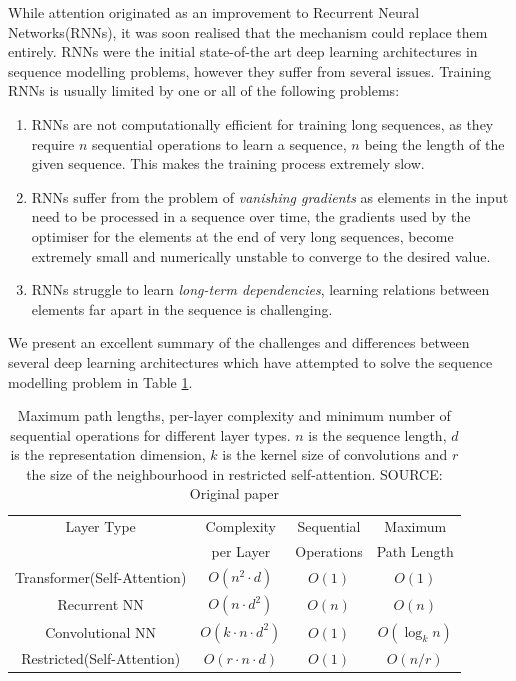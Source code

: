 While attention originated as an improvement to Recurrent Neural Networks(RNNs), it was soon realised that the mechanism could replace them entirely.\cite{vaswaniAttentionAllYou2017}
RNNs were the initial state-of-the art deep learning architectures in sequence modelling problems, however they suffer from several issues. Training RNNs is usually limited by one or all of the following problems:
\begin{enumerate}
\item RNNs are not computationally efficient for training long sequences, as they require $n$ sequential operations to learn a sequence, $n$ being the length of the given sequence. This makes the training process extremely slow.
\item RNNs suffer from the problem of \emph{vanishing gradients} \ie as elements in the input need to be processed in a sequence over time, the gradients used by the optimiser\cite{Robbins2007ASA} for the elements at the end of very long sequences, become extremely small and numerically unstable to converge to the desired value.
\item RNNs struggle to learn \emph{long-term dependencies}, \ie learning relations between elements far apart in the sequence is challenging.
\end{enumerate}

We present an excellent summary of the challenges and differences between several deep learning architectures which have attempted to solve the sequence modelling problem in Table \ref{bg:table1}.

\begin{table}[htbp]
\centering
\begin{tabular}{ c   c   c  c  }
\toprule
Layer Type & Complexity   & Sequential   & Maximum \\
& per Layer & Operations & Path Length \\
\midrule
Transformer(Self-Attention) & $O(n^2 \cdot d)$ & $O(1)$ & $O(1)$ \\
Recurrent NN & $O(n \cdot d^2)$ & $O(n)$ & $O(n)$ \\
Convolutional NN & $O(k \cdot n \cdot d^2)$ & $O(1)$ & $O(\log_{k}{n})$\\
Restricted(Self-Attention) & $O(r \cdot n \cdot d)$ & $O(1)$ & $O(n/r)$\\
\bottomrule
\end{tabular}
\caption{Maximum path lengths, per-layer complexity and minimum number of sequential operations
for different layer types. $n$ is the sequence length, $d$ is the representation dimension, $k$ is the kernel
size of convolutions and $r$ the size of the neighbourhood in restricted self-attention.
SOURCE: Original paper\cite{vaswaniAttentionAllYou2017}}
\label{bg:table1}
\end{table}


